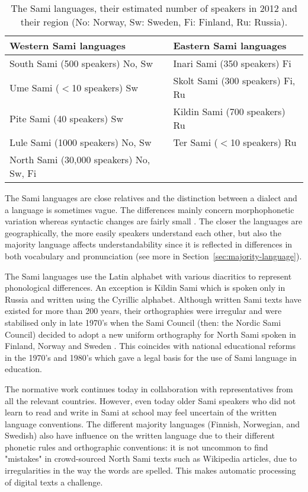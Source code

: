 \documentclass[runningheads,a4paper]{llncs}
\begin{document}
\begin{table} \center
\caption{The Sami languages, their estimated number of speakers in 2012 \cite{Gruenthal:Siegl:12} and their region (No: Norway, Sw: Sweden, Fi: Finland, Ru: Russia).}
\label{tab:languages}
\begin{tabular}{| l | l | } \hline
\textbf{Western Sami languages}           & \textbf{Eastern Sami languages} \\ \hline
South Sami (500 speakers) No, Sw          & Inari Sami (350 speakers) Fi \\ \hline
Ume Sami ($<$10 speakers) Sw              & Skolt Sami (300 speakers) Fi, Ru \\ \hline
Pite Sami (40 speakers) Sw                & Kildin Sami (700 speakers) Ru \\ \hline
Lule Sami (1000 speakers) No, Sw          & Ter Sami ($<$10 speakers) Ru \\ \hline
North Sami (30,000 speakers) No, Sw, Fi   &  \\ \hline
\end{tabular}
\end{table}

The Sami languages are close relatives and the distinction between a dialect and a language is sometimes vague. The differences mainly concern morphophonetic variation whereas syntactic changes are fairly small \cite{Palismaa:Eira:01}. The closer the languages are geographically, the more easily speakers understand each other, but also the majority language affects understandability since it is reflected in differences in both vocabulary and pronunciation (see more in Section~\ref{sec:majority-language}).

The Sami languages use the Latin alphabet with various diacritics to represent phonological differences. An exception is Kildin Sami which is spoken only in Russia and written using the Cyrillic alphabet. Although written Sami texts have existed for more than 200 years, their orthographies were irregular and were stabilised only in late 1970's when the Sami Council (then: the Nordic Sami Council) decided to adopt a new uniform orthography for North Sami spoken in Finland, Norway and Sweden  \cite{Kulonen:ea:05}. This coincides with national educational reforms in the 1970's and 1980's which gave a legal basis for the use of Sami language in education.

The normative work continues today in collaboration with representatives from all the relevant countries. However, even today older Sami speakers who did not learn to read and write in Sami at school may feel uncertain of the written language conventions. The different majority languages (Finnish, Norwegian, and Swedish) also have influence on the written language due to their different phonetic rules and orthographic conventions: it is not uncommon to find "mistakes" in crowd-sourced North Sami texts such as Wikipedia articles, due to irregularities in the way the words are spelled. This makes automatic processing of digital texts a challenge.
\end{document}
